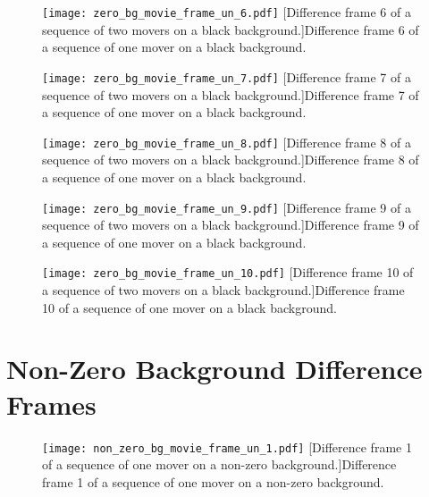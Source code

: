 \clearpage

\begin{figure}[!ht]
	\centering
	\texttt{[image: zero\_bg\_movie\_frame\_un\_6.pdf]}
	[Difference frame 6 of a sequence of two movers on a black background.]{Difference frame 6 of a sequence of one mover on a black background.}
	\label{fig:zero_bg_movie_frame_un_6}
\end{figure}



\begin{figure}[!ht]
	\centering
	\texttt{[image: zero\_bg\_movie\_frame\_un\_7.pdf]}
	[Difference frame 7 of a sequence of two movers on a black background.]{Difference frame 7 of a sequence of one mover on a black background.}
	\label{fig:zero_bg_movie_frame_un_7}
\end{figure}

\begin{figure}[!ht]
	\centering
	\texttt{[image: zero\_bg\_movie\_frame\_un\_8.pdf]}
	[Difference frame 8 of a sequence of two movers on a black background.]{Difference frame 8 of a sequence of one mover on a black background.}
	\label{fig:zero_bg_movie_frame_un_8}
\end{figure}

\clearpage

\begin{figure}[!ht]
	\centering
	\texttt{[image: zero\_bg\_movie\_frame\_un\_9.pdf]}
	[Difference frame 9 of a sequence of two movers on a black background.]{Difference frame 9 of a sequence of one mover on a black background.}
	\label{fig:zero_bg_movie_frame_un_9}
\end{figure}

\begin{figure}[!ht]
	\centering
	\texttt{[image: zero\_bg\_movie\_frame\_un\_10.pdf]}
	[Difference frame 10 of a sequence of two movers on a black background.]{Difference frame 10 of a sequence of one mover on a black background.}
	\label{fig:zero_bg_movie_frame_un_10}
\end{figure}

\clearpage

\section{Non-Zero Background Difference Frames}

\begin{figure}[!ht]
	\centering
	\texttt{[image: non\_zero\_bg\_movie\_frame\_un\_1.pdf]}
	[Difference frame 1 of a sequence of one mover on a non-zero background.]{Difference frame 1 of a sequence of one mover on a non-zero background.}
	\label{fig:non_zero_bg_movie_frame_un_1}
\end{figure}

